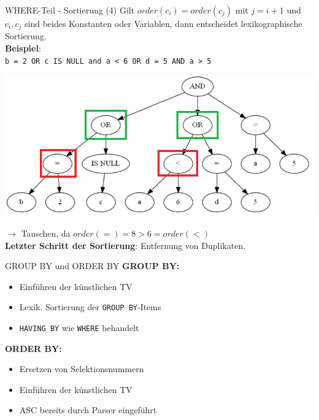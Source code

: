 \documentclass{beamer}
\begin{document}
\begin{frame}[fragile]{WHERE-Teil - Sortierung (4)}
Gilt $order(c_i) = order(c_j)$ mit $j = i + 1$ und $c_i,c_j$ sind beides Konstanten oder Variablen, dann entscheidet lexikographische Sortierung.\\
\vspace{5mm}
\textbf{Beispiel}:\\

\verb|b = 2 OR c IS NULL and a < 6 OR d = 5 AND a > 5|
\begin{center}
\includegraphics[scale=0.27]{sort_step2.png}
\end{center}

$\to$ Tauschen, da $order(=) = 8 > 6 = order(<) $\\
\textbf{Letzter Schritt der Sortierung}: Entfernung von Duplikaten.
\end{frame}

\begin{frame}[fragile]{GROUP BY und ORDER BY}
\textbf{GROUP BY:}
\begin{itemize}
\item Einführen der künstlichen TV
\item Lexik. Sortierung der \verb|GROUP BY|-Items
\item \verb|HAVING BY| wie \verb|WHERE| behandelt
\end{itemize}
\textbf{ORDER BY:}
\begin{itemize}
\item Ersetzen von Selektionsnummern 
\item Einführen der künstlichen TV
\item ASC bereits durch Parser eingeführt
\end{itemize}
\end{frame}
\end{document}
